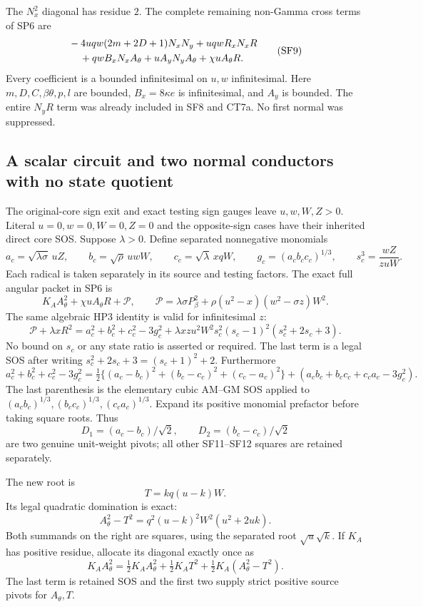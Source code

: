 The $N_x^2$ diagonal has residue $2$. The complete remaining
non-Gamma cross terms of SP6 are
\[
 \begin{split}
 &-4uqw(2m+2D+1)N_xN_y+uqwR_xN_xR\\
 &\hspace{4mm}+qwB_xN_xA_\theta+uA_yN_yA_\theta
                         +\chi uA_\theta R.
 \end{split}
 \tag{SF9}
\]
Every coefficient is a bounded infinitesimal on $u,w$ infinitesimal.
Here $m,D,C,\beta\theta,p,l$ are bounded, $B_x=8\kappa e$ is
infinitesimal, and $A_y$ is bounded. The entire $N_yR$ term was
already included in SF8 and CT7a. No first normal was suppressed.

\subsection{A scalar circuit and two normal conductors with no state quotient}

The original-core sign exit and exact testing sign gauges leave
$u,w,W,Z>0$. Literal $u=0,w=0,W=0,Z=0$ and the opposite-sign
cases have their inherited direct core SOS. Suppose $\lambda>0$.
Define separated nonnegative monomials
\[
 a_c=\sqrt{\lambda\sigma}\,uZ,\qquad
 b_c=\sqrt\rho\,uwW,\qquad
 c_c=\sqrt\lambda\,xqW,\qquad
 g_c=(a_cb_cc_c)^{1/3},\qquad
 s_c^3=\frac{wZ}{zuW}.
 \tag{SF10}
\]
Each radical is taken separately in its source and testing factors.
The exact full angular packet in SP6 is
\[
 K_AA_\theta^2+\chi uA_\theta R+\mathscr P,
 \qquad
 \mathscr P=\lambda\sigma P_\beta^2
       +\rho(u^2-x)(w^2-\sigma z)W^2.
\]
The same algebraic HP3 identity is valid for infinitesimal $z$:
\[
 \mathscr P+\lambda xR^2
 =a_c^2+b_c^2+c_c^2-3g_c^2
   +\lambda xzu^2W^2s_c^2(s_c-1)^2(s_c^2+2s_c+3).
 \tag{SF11}
\]
No bound on $s_c$ or any state ratio is asserted or required. The last
term is a legal SOS after writing $s_c^2+2s_c+3=(s_c+1)^2+2$.
Furthermore
\[
 a_c^2+b_c^2+c_c^2-3g_c^2
 =\tfrac12\{(a_c-b_c)^2+(b_c-c_c)^2+(c_c-a_c)^2\}
      +(a_cb_c+b_cc_c+c_ca_c-3g_c^2).
 \tag{SF12}
\]
The last parenthesis is the elementary cubic AM--GM SOS applied to
$(a_cb_c)^{1/3},(b_cc_c)^{1/3},(c_ca_c)^{1/3}$. Expand its
positive monomial prefactor before taking square roots. Thus
\[
 D_1=(a_c-b_c)/\sqrt2,\qquad
 D_2=(b_c-c_c)/\sqrt2
\]
are two genuine unit-weight pivots; all other SF11--SF12 squares
are retained separately.

The new root is
\[
 T=kq(u-k)W.
\]
Its legal quadratic domination is exact:
\[
 A_\theta^2-T^2=q^2(u-k)^2W^2(u^2+2uk).
 \tag{SF13}
\]
Both summands on the right are squares, using the separated root
$\sqrt u\sqrt k$. If $K_A$ has positive residue, allocate its
diagonal exactly once as
\[
 K_AA_\theta^2=\tfrac12K_AA_\theta^2+\tfrac12K_AT^2
                        +\tfrac12K_A(A_\theta^2-T^2).
 \tag{SF14}
\]
The last term is retained SOS and the first two supply strict
positive source pivots for $A_\theta,T$.

